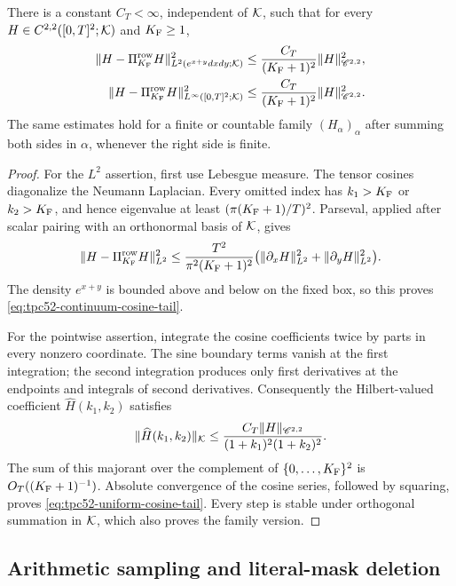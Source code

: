 \begin{theorem}
\label{thm:tpc52-Hilbert-cosine-compression}
There is a constant \(C_T<\infty\), independent of \(\mathcal K\), such that
for every \(H\in C^{2,2}([0,T]^2;\mathcal K)\) and \(K_{\rm F}\geq1\),
\begin{align}
 \|H-\Pi_{K_{\rm F}}^{\rm row}H\|_{L^2(e^{x+y}dxdy;\mathcal K)}^2
 &\leq \frac{C_T}{(K_{\rm F}+1)^2}
       \|H\|_{\mathscr C^{2,2}}^2,
 \label{eq:tpc52-continuum-cosine-tail}\\
 \|H-\Pi_{K_{\rm F}}^{\rm row}H\|_{L^\infty([0,T]^2;\mathcal K)}^2
 &\leq \frac{C_T}{(K_{\rm F}+1)^2}
       \|H\|_{\mathscr C^{2,2}}^2.
 \label{eq:tpc52-uniform-cosine-tail}
\end{align}
The same estimates hold for a finite or countable family
\((H_\alpha)_\alpha\) after summing both sides in \(\alpha\), whenever
the right side is finite.
\end{theorem}

\begin{proof}
For the \(L^2\) assertion, first use Lebesgue measure.  The tensor
cosines diagonalize the Neumann Laplacian.  Every omitted index has
  \(k_1>K_{\rm F}\) or \(k_2>K_{\rm F}\), and hence eigenvalue at least
  \((\pi(K_{\rm F}+1)/T)^2\).  Parseval, applied after scalar pairing with an
orthonormal basis of \(\mathcal K\), gives
\[
 \|H-\Pi_{K_{\rm F}}^{\rm row}H\|_{L^2}^2
 \leq \frac{T^2}{\pi^2(K_{\rm F}+1)^2}
 \bigl(\|\partial_xH\|_{L^2}^2+
       \|\partial_yH\|_{L^2}^2\bigr).
\]
The density \(e^{x+y}\) is bounded above and below on the fixed box,
so this proves \eqref{eq:tpc52-continuum-cosine-tail}.

For the pointwise assertion, integrate the cosine coefficients twice
by parts in every nonzero coordinate.  The sine boundary terms vanish
at the first integration; the second integration produces only first
derivatives at the endpoints and integrals of second derivatives.
Consequently the Hilbert-valued coefficient \(\widehat H(k_1,k_2)\)
satisfies
\[
 \|\widehat H(k_1,k_2)\|_{\mathcal K}
 \leq
 \frac{C_T\|H\|_{\mathscr C^{2,2}}}
      {(1+k_1)^2(1+k_2)^2}.
\]
The sum of this majorant over the complement of
\(\{0,\ldots,K_{\rm F}\}^2\) is
\(O_T((K_{\rm F}+1)^{-1})\).  Absolute convergence of
the cosine series, followed by squaring, proves
\eqref{eq:tpc52-uniform-cosine-tail}.  Every step is stable under
orthogonal summation in \(\mathcal K\), which also proves the family version.
\end{proof}

\subsection{Arithmetic sampling and literal-mask deletion}

